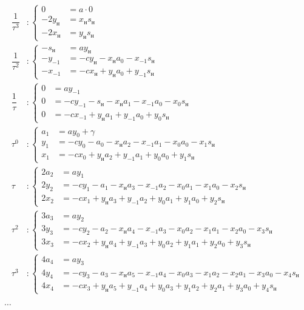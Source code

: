 $$
	\begin{aligned}
		\dfrac{1}{\tau^3} &:		
		\left\{
			\begin{aligned}
				0 &= a \cdot 0 \\
				-2y_{\text{н}} &= x_{\text{н}} s_{\text{н}} \\
				-2x_{\text{н}} &= y_{\text{н}} s_{\text{н}}
			\end{aligned}
		\right.
		\\		
		\dfrac{1}{\tau^2} &:	
		\left\{
			\begin{aligned}
				-s_{\text{н}} &= ay_{\text{н}} \\
				-y_{-1} &= -cy_{\text{н}} - x_{\text{н}}a_0 - x_{-1}s_{\text{н}}  \\
				-x_{-1} &= -cx_{\text{н}} + y_{\text{н}}a_0 + y_{-1}s_{\text{н}}
			\end{aligned}
		\right.
		\\
		\dfrac{1}{\tau} &:	
		\left\{
			\begin{aligned}
				0 &= ay_{-1} \\
				0 &= -cy_{-1} - s_{\text{н}} - x_{\text{н}}a_1 - x_{-1}a_0 - x_0s_{\text{н}}  \\
				0 &= -cx_{-1} + y_{\text{н}}a_1 + y_{-1}a_0 + y_{0}s_{\text{н}}
			\end{aligned}
		\right.
		\\
		\tau^0 &:	
		\left\{
			\begin{aligned}
				a_1 &= ay_{0} + \gamma \\
				y_1 &= -cy_{0} - a_0 - x_{\text{н}}a_2 - x_{-1}a_1 - x_0a_0 - x_1s_{\text{н}}  \\
				x_1 &= -cx_{0} + y_{\text{н}}a_2 + y_{-1}a_1 + y_{0}a_0 + y_1s_{\text{н}}
			\end{aligned}
		\right.
		\\
		\tau &:	
		\left\{
			\begin{aligned}
				2a_2 &= ay_{1} \\
				2y_2 &= -cy_{1} - a_1 - x_{\text{н}}a_3 - x_{-1}a_2 - x_0a_1 - x_1a_0 - x_2s_{\text{н}}  \\
				2x_2 &= -cx_{1} + y_{\text{н}}a_3 + y_{-1}a_2 + y_{0}a_1 + y_1a_0 + y_2s_{\text{н}}
			\end{aligned}
		\right.
		\\
		\tau^2 &:	
		\left\{
			\begin{aligned}
				3a_3 &= ay_{2} \\
				3y_3 &= -cy_{2} - a_2 - x_{\text{н}}a_4 - x_{-1}a_3 - x_0a_2 - x_1a_1 - x_2a_0 - x_3s_{\text{н}} \\
				3x_3 &= -cx_{2} + y_{\text{н}}a_4 + y_{-1}a_3 + y_{0}a_2 + y_1a_1 + y_2a_0 + y_3s_{\text{н}}
			\end{aligned}
		\right.
		\\
		\tau^3 &:	
		\left\{
			\begin{aligned}
				4a_4 &= ay_{3} \\
				4y_4 &= -cy_{3} - a_3 - x_{\text{н}}a_5 - x_{-1}a_4 - x_0a_3 - x_1a_2 - x_2a_1 - x_3a_0 - x_4s_{\text{н}} \\
				4x_4 &= -cx_{3} + y_{\text{н}}a_5 + y_{-1}a_4 + y_{0}a_3 + y_1a_2 + y_2a_1 + y_3a_0 + y_4s_{\text{н}}
			\end{aligned}
		\right. 
	\end{aligned}
$$
\begin{center}
	$ \ldots $
\end{center}
						





